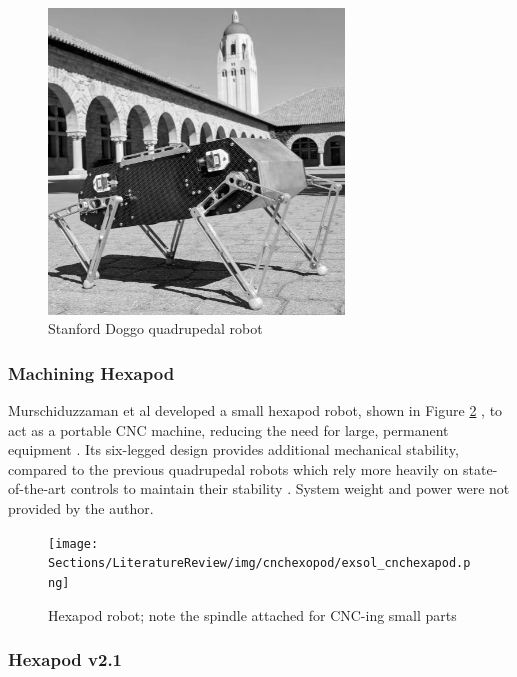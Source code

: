 \begin{figure}[H]
    \centering
    \includegraphics[width=0.7\textwidth]{Sections/LiteratureReview/img/doggo/exsol_doggo.JPG}
    \caption{Stanford Doggo quadrupedal robot \cite{kau_stanford_2019}}
    \label{fig:doggo_img}
\end{figure}

\subsubsection{Machining Hexapod}

Murschiduzzaman et al developed a small hexapod robot, shown in Figure \ref{fig:cnchexopod_cad} \cite{murshiduzzaman_hexapod_2019}, to act as a portable CNC machine, reducing the need for large, permanent equipment \cite{murshiduzzaman_hexapod_2019}. Its six-legged design provides additional mechanical stability, compared to the previous quadrupedal robots which rely more heavily on state-of-the-art controls to maintain their stability \cite{bottcher_principles_nodate}. 
System weight and power were not provided by the author.

\begin{figure}[H]
    \centering
    \texttt{[image: Sections/LiteratureReview/img/cnchexopod/exsol\_cnchexapod.png]}
    \caption{Hexapod robot; note the spindle attached for CNC-ing small parts \cite{murshiduzzaman_hexapod_2019}}
    \label{fig:cnchexopod_cad}
\end{figure}

\subsubsection{Hexapod v2.1}

